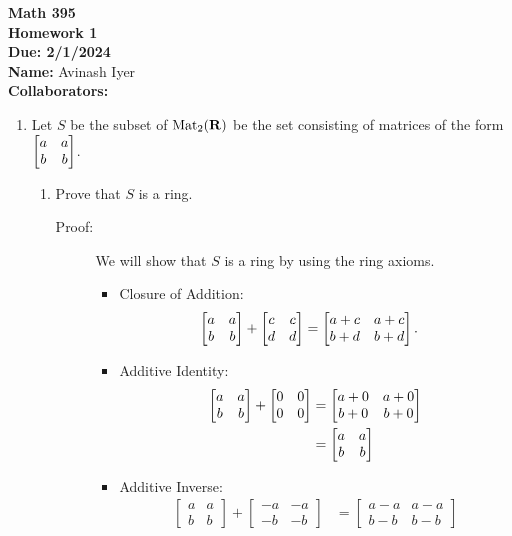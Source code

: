 \documentclass[11pt]{article}
\begin{document}
\begin{center}
{\bf \Large Math 395 \\[0.1in]Homework 1 \\[0.1in]
Due: 2/1/2024}\\[.25in]
{\bf Name:} {Avinash Iyer}\\[0.15in]
{\bf Collaborators:} {\underline{\hspace*{4.5in}}} \\
\end{center}

\begin{enumerate}

\item Let $S$ be the subset of $\operatorname{Mat}_{2}(\mathbf{R})$  be the set consisting of matrices of the form $\left[ \begin{matrix} a & a \\ b & b \end{matrix} \right]$. 
\begin{enumerate}
\item Prove that $S$ is a ring.\\
  \begin{description}
    \item[Proof:] We will show that $S$ is a ring by using the ring axioms.
      \begin{itemize}
        \item Closure of Addition:
          \begin{align*}
            \left[ \begin{matrix} a & a \\ b&b\end{matrix} \right] + \left[ \begin{matrix} c&c\\d&d\end{matrix} \right] &= \left[ \begin{matrix} a+c & a+c\\b+d & b+d\end{matrix} \right].
          \end{align*}
        \item Additive Identity:
          \begin{align*}
            \left[ \begin{matrix} a&a\\b&b\end{matrix} \right] + \left[ \begin{matrix} 0&0\\0&0\end{matrix} \right] &= \left[ \begin{matrix} a+0 & a+0\\b+0 & b+0\end{matrix} \right]\\
                   &= \begin{bmatrix}a&a\\b&b\end{bmatrix}
          \end{align*}
        \item Additive Inverse:
          \begin{align*}
            \begin{bmatrix}a&a\\b&b\end{bmatrix} + \begin{bmatrix}-a&-a \\ -b&-b\end{bmatrix} &= \begin{bmatrix}a-a&a-a\\b-b&b-b\end{bmatrix}\\

\end{align*}
\end{itemize}
\end{description}
\end{enumerate}
\end{enumerate}
\end{document}
